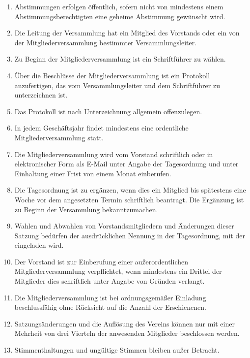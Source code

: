 \documentclass[12pt,a4paper,draft]{article}
\begin{document}
\begin{enumerate}
\item Abstimmungen erfolgen öffentlich, sofern nicht von mindestens einem 
Abstimmungsberechtigten eine geheime Abstimmung gewünscht wird.

\item Die Leitung der Versammlung hat ein Mitglied des Vorstands oder ein von 
der Mitgliederversammlung bestimmter Versammlungsleiter.

\item Zu Beginn der Mitgliederversammlung ist ein Schriftführer zu wählen.

\item Über die Beschlüsse der Mitgliederversammlung ist ein Protokoll 
anzufertigen, das vom Versammlungsleiter und dem Schriftführer zu unterzeichnen 
ist.

\item Das Protokoll ist nach Unterzeichnung allgemein offenzulegen.

\item In jedem Geschäftsjahr findet mindestens eine ordentliche 
Mitgliederversammlung statt.

\item Die Mitgliederversammlung wird vom Vorstand schriftlich oder in 
elektronischer Form als E-Mail unter Angabe der Tagesordnung und unter 
Einhaltung einer Frist von einem Monat einberufen. %

\item Die Tagesordnung ist zu ergänzen, wenn dies ein Mitglied bis spätestens 
eine Woche vor dem angesetzten Termin schriftlich beantragt. Die Ergänzung 
ist zu Beginn der Versammlung bekanntzumachen.

\item Wahlen und Abwahlen von Vorstandsmitgliedern und Änderungen dieser 
Satzung bedürfen der ausdrücklichen Nennung in der Tagesordnung, mit der 
eingeladen wird.

\item Der Vorstand ist zur Einberufung einer außerordentlichen 
Mitgliederversammlung verpflichtet, wenn mindestens ein Drittel der Mitglieder 
dies schriftlich unter Angabe von Gründen verlangt. %

\item Die Mitgliederversammlung ist bei ordnungsgemäßer Einladung 
beschlussfähig ohne Rücksicht auf die Anzahl der Erschienenen.

\item Satzungsänderungen und die Auflösung des Vereins können nur mit einer 
Mehrheit von drei Vierteln der anwesenden Mitglieder beschlossen werden. 

\item Stimmenthaltungen und ungültige Stimmen bleiben außer Betracht.
\end{enumerate}
\end{document}

